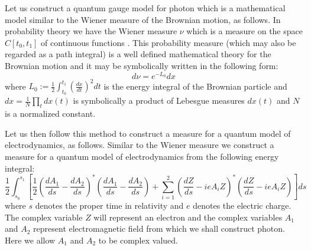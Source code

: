 \documentclass[a4paper,a4paper]{article}
\begin{document}
Let us construct a quantum gauge model for photon which is a mathematical model similar to the Wiener measure of the Brownian motion, as follows.
In probability theory we have the Wiener measure $\nu$ which is
a measure on the space $C[t_0,t_1]$ of continuous functions \cite{Jaf}.
This probability measure (which may also be regarded as a path integral) is a well defined mathematical theory for the Brownian motion and it may be symbolically written in the following form:
\begin{equation}
d\nu =e^{-L_0}dx
\label{wiener}
\end{equation}
where $L_0 := \frac12\int_{t_0}^{t_1}\left(\frac{dx}{dt}\right)^2dt$
is the energy integral of the Brownian particle and
$dx = \frac{1}{N}\prod_{t}dx(t)$ is symbolically a product of Lebesgue
measures $dx(t)$ and $N$ is a normalized constant.

Let us then follow this method to construct a measure for a quantum  model of electrodynamics, as follows. Similar to the Wiener measure we construct a measure for a quantum  model of electrodynamics from the 
following energy integral:
\begin{equation}
 \frac12\int_{s_0}^{s_1}[
\frac12\left(\frac{dA_1}{ds}-\frac{dA_2}{ds}\right)^*
\left(\frac{dA_1}{ds}-\frac{dA_2}{ds}\right)
+\sum_{i=1}^2
\left(\frac{dZ}{ds}-ieA_iZ\right)^*\left(\frac{dZ}{ds}-ieA_iZ\right)]ds
\label{1.1}
\end{equation}
where $s$ denotes the proper time in relativity and $e$
denotes the electric charge. The complex variable $Z$ will 
represent an electron and the complex variables
$A_1$ and $A_2$ represent electromagnetic field from which we shall construct  photon.
Here we allow $A_1$ and $A_2$ to be complex valued. 
\end{document}
